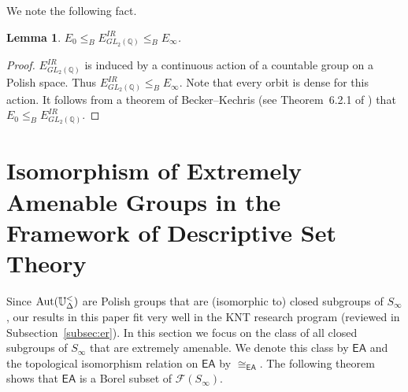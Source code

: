 \documentclass{amsart}
\newtheorem{lemma}[theorem]{Lemma}
\theoremstyle{definition}
\theoremstyle{remark}
\begin{document}
We note the following fact.

\begin{lemma}\label{lem:E0lowerbound} $E_0\leq_B E_{GL_2(\mathbb{Q})}^{IR}\leq_B E_\infty$.
\end{lemma}

\begin{proof} $E_{GL_2(\mathbb{Q})}^{IR}$ is induced by a continuous action of a countable group on a Polish space. Thus $E_{GL_2(\mathbb{Q})}^{IR}\leq_B E_\infty$. Note that every orbit is dense for this action. It follows from a theorem of Becker--Kechris (see Theorem~6.2.1 of \cite{GaoBook}) that $E_0\leq_B E_{GL_2(\mathbb{Q})}^{IR}$.
\end{proof}









   

\section{Isomorphism of Extremely Amenable Groups in the Framework of Descriptive Set Theory\label{sec:6}}

Since $\mbox{\rm Aut}(\mathbb{U}^<_\Delta)$ are Polish groups that are (isomorphic to) closed subgroups of $S_\infty$, our results in this paper fit  very well in the KNT research program (reviewed in Subsection~\ref{subsec:er}). In this section we focus on the class of all closed subgroups of $S_\infty$ that are extremely amenable. We denote this class by $\mathsf{EA}$ and the topological isomorphism relation on $\mathsf{EA}$ by $\cong_{\mathsf{EA}}$. The following theorem shows that $\mathsf{EA}$ is a Borel subset of $\mathcal{F}(S_\infty)$.
\end{document}
